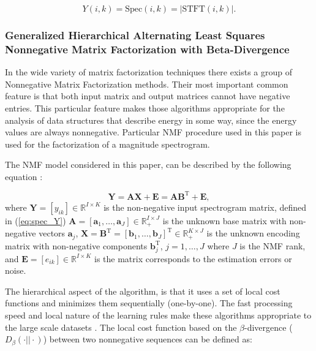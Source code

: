 \documentclass[3p,times]{elsarticle}
\begin{document}
\begin{equation}
\label{eq:spec_Y}
Y(i,k)=\textrm{Spec}(i,k)=|\textrm{STFT}(i,k)|.
\end{equation}



\subsubsection{Generalized Hierarchical Alternating Least Squares Nonnegative Matrix Factorization with Beta-Divergence}\label{s:nmf}

 
In the wide variety of matrix factorization techniques there exists a group of Nonnegative Matrix Factorization methods. Their most important common feature is that both input matrix and output matrices cannot have negative entries. This particular feature makes those algorithms appropriate for the analysis of data structures that describe energy in some way, since the energy values are always nonnegative. Particular NMF procedure used in this paper is used for the factorization of a magnitude spectrogram.

The NMF model considered in this paper, can be described by the following equation \cite{cichocki2009nonnegative}:

\begin{equation}
  \label{eq:NMF} 
  \mathbf{Y}=\mathbf{AX}+\mathbf{E} = \mathbf{AB}^\textrm{T} +\mathbf{E},
\end{equation}
where $\mathbf{Y}=[y_{ik}] \in \mathbb{R}^{I\times K}$ is the non-negative input spectrogram matrix, defined in (\ref{eq:spec_Y}) $\mathbf{A} = [\mathbf{a}_1, \dots, \mathbf{a}_J] \in \mathbb{R}_+^{I\times J}$ is the unknown base matrix with non-negative vectors $\mathbf{a}_j$, $\mathbf{X}=\mathbf{B}^\textrm{T} = [\mathbf{b}_1,\dots, \mathbf{b}_J]^\textrm{T} \in \mathbb{R}_{+}^{K\times J}$ is the unknown encoding matrix with non-negative components $\mathbf{b}_j^\textrm{T}$, $j=1,\dots,J$ where $J$ is the NMF rank, and $\mathbf{E}=[e_{ik}] \in \mathbb{R}^{I \times K}$ is the matrix corresponds to the estimation errors or noise.

The hierarchical aspect of the algorithm, is that it uses a set of local cost functions and minimizes them sequentially (one-by-one). The fast processing speed and local nature of the learning rules make these algorithms appropriate to the large scale datasets \cite{cichocki2008flexible,cichocki2009fast}. The local cost function based on the $\beta$-divergence ($D_\beta(\cdot||\cdot)$) between two nonnegative sequences can be defined as:
\end{document}
